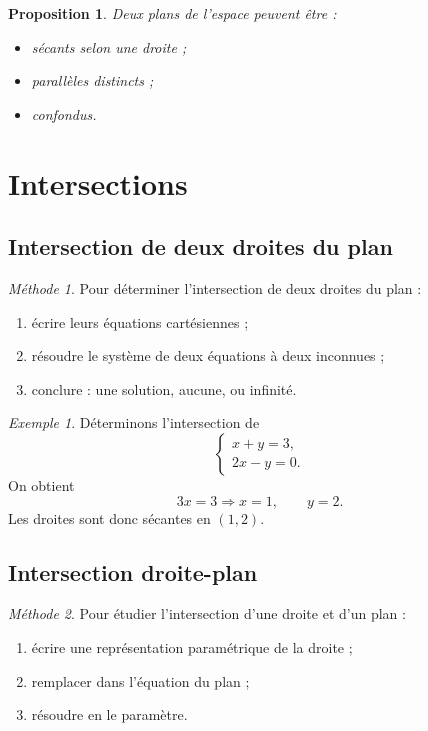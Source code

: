 \documentclass[11pt,a4paper]{article}
\newtheorem{proposition}[definition]{Proposition}
\theoremstyle{remark}
\newtheorem{exemple}[definition]{Exemple}
\newtheorem*{methode}{Méthode}
\begin{document}
\begin{proposition}
Deux plans de l’espace peuvent être :
\begin{itemize}
    \item sécants selon une droite ;
    \item parallèles distincts ;
    \item confondus.
\end{itemize}
\end{proposition}

\section{Intersections}

\subsection{Intersection de deux droites du plan}

\begin{methode}
Pour déterminer l’intersection de deux droites du plan :
\begin{enumerate}
    \item écrire leurs équations cartésiennes ;
    \item résoudre le système de deux équations à deux inconnues ;
    \item conclure : une solution, aucune, ou infinité.
\end{enumerate}
\end{methode}

\begin{exemple}
Déterminons l’intersection de
\[
\begin{cases}
x+y=3,\\
2x-y=0.
\end{cases}
\]
On obtient
\[
3x=3 \Longrightarrow x=1,
\qquad y=2.
\]
Les droites sont donc sécantes en \((1,2)\).
\end{exemple}

\subsection{Intersection droite-plan}

\begin{methode}
Pour étudier l’intersection d’une droite et d’un plan :
\begin{enumerate}
    \item écrire une représentation paramétrique de la droite ;
    \item remplacer dans l’équation du plan ;
    \item résoudre en le paramètre.
\end{enumerate}
\end{methode}
\end{document}
